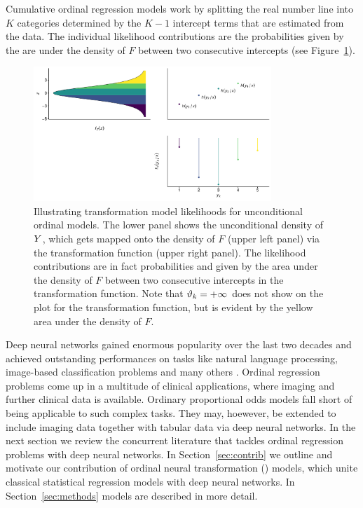 \documentclass[article,nojss,shortnames]{jss}\usepackage[]{graphicx}\usepackage[]{color}
\begin{document}
Cumulative ordinal regression models work by splitting the real number line into
$K$ categories determined by the $K - 1$ intercept terms that are estimated from
the data. The individual likelihood contributions are the probabilities given by
the are under the density of $F$ between two consecutive intercepts
(see Figure~\ref{fig:discrete}).
\begin{figure}
\centering
\includegraphics[width=0.8\textwidth]{figures/discrete}
\caption{Illustrating transformation model likelihoods for unconditional ordinal
models. The lower panel shows the unconditional density of $Y$, which gets
mapped onto the density of $F$ (upper left panel) via the transformation function
(upper right panel). The likelihood contributions are in fact probabilities and
given by the area under the density of $F$ between two consecutive intercepts in the
transformation function. Note that $\vartheta_k = + \infty$ does not show on the
plot for the transformation function, but is evident by the yellow area under
the density of $F$.} \label{fig:discrete}
\end{figure}

Deep neural networks gained enormous popularity over the last two decades and
achieved outstanding performances on tasks like natural language processing,
image-based classification problems and many others \citep{goodfellow2016deep}.
Ordinal regression problems come up in a multitude of clinical applications, where
imaging and further clinical data is available.
Ordinary proportional odds models fall short of being applicable to such complex
tasks. They may, hoewever, be extended to include imaging data together with tabular
data via deep neural networks. In the next section we review the concurrent
literature that tackles ordinal regression problems with deep neural networks.
In Section~\ref{sec:contrib} we outline and motivate our contribution of ordinal
neural transformation () models, which unite classical statistical
regression models with deep neural networks. In Section~\ref{sec:methods}
 models are described in more detail.
\end{document}
